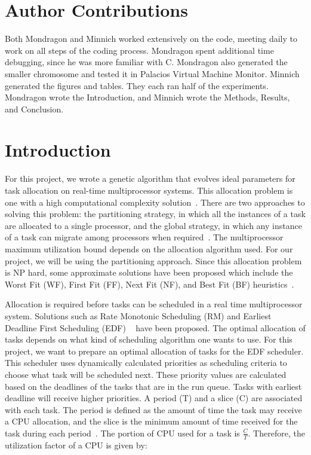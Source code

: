 \documentclass[11pt]{article}
\begin{document}
\maketitle
\doublespacing

\section{Author Contributions}
Both Mondragon and Minnich worked extensively on the code, meeting daily to work on all steps of the coding process. Mondragon spent additional time debugging, since he was more familiar with C. Mondragon also generated the smaller chromosome and tested it in Palacios Virtual Machine Monitor. Minnich generated the figures and tables. They each ran half of the experiments. Mondragon wrote the Introduction, and Minnich wrote the Methods, Results, and Conclusion.

\section{Introduction}

For this project, we wrote a genetic algorithm that evolves ideal parameters for task allocation on real-time multiprocessor systems. This allocation problem is one with a high computational complexity solution~\cite{Mondragon:13}. There are two approaches to solving this problem: the partitioning strategy, in which all the instances of a task are allocated to a single processor, and the global strategy, in which any instance of a task can migrate among processors when required~\cite{Lopez:04}. The multiprocessor maximum utilization bound depends on the allocation algorithm used. For our project, we will be using the partitioning approach.  Since this allocation problem is NP hard, some approximate solutions have been proposed which include the Worst Fit (WF), First Fit (FF), Next Fit (NF), and Best Fit (BF) heuristics~\cite{Zapata:05}. 

Allocation is required before tasks can be scheduled in a real time multiprocessor system. Solutions such as Rate Monotonic Scheduling (RM) and Earliest Deadline First Scheduling (EDF) ~\cite{Dall:78} have been proposed. The optimal allocation of tasks depends on what kind of scheduling algorithm one wants to use. For this project, we want to prepare an optimal allocation of tasks for the EDF scheduler. This scheduler uses dynamically calculated priorities as scheduling criteria to choose what task will be scheduled next. These priority values are calculated based on the deadlines of the tasks that are in the run queue. Tasks with earliest deadline will receive higher priorities. A period (T) and a slice (C) are associated with each task. The period is defined as the amount of time the task may receive a CPU allocation, and the slice is the minimum amount of time received for the task during each period~\cite{Chung:73}. The portion of CPU used for a task is $\frac{C}{T}$. Therefore, the utilization factor of a CPU is given by: 
\end{document}
